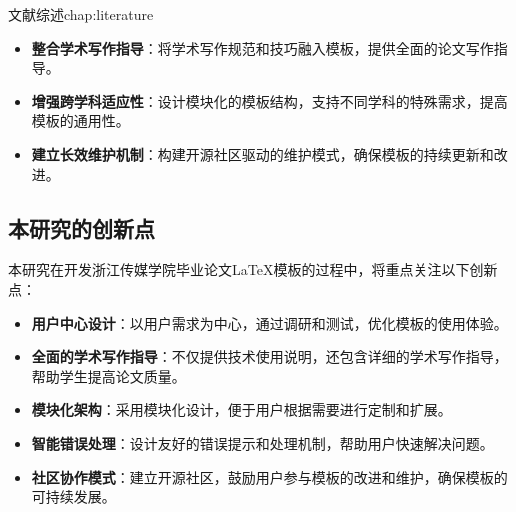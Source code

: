 \begin{cuzchapter}{文献综述}{chap:literature}
\begin{itemize}
		\item \textbf{整合学术写作指导}：将学术写作规范和技巧融入模板，提供全面的论文写作指导。
		
		\item \textbf{增强跨学科适应性}：设计模块化的模板结构，支持不同学科的特殊需求，提高模板的通用性。
		
		\item \textbf{建立长效维护机制}：构建开源社区驱动的维护模式，确保模板的持续更新和改进。
	\end{itemize}
	
	\subsection{本研究的创新点}
	
	本研究在开发浙江传媒学院毕业论文\LaTeX{}模板的过程中，将重点关注以下创新点：
	
	\begin{itemize}
		\item \textbf{用户中心设计}：以用户需求为中心，通过调研和测试，优化模板的使用体验。
		
		\item \textbf{全面的学术写作指导}：不仅提供技术使用说明，还包含详细的学术写作指导，帮助学生提高论文质量。
		
		\item \textbf{模块化架构}：采用模块化设计，便于用户根据需要进行定制和扩展。
		
		\item \textbf{智能错误处理}：设计友好的错误提示和处理机制，帮助用户快速解决问题。
		
		\item \textbf{社区协作模式}：建立开源社区，鼓励用户参与模板的改进和维护，确保模板的可持续发展。
	\end{itemize}

\end{cuzchapter}

